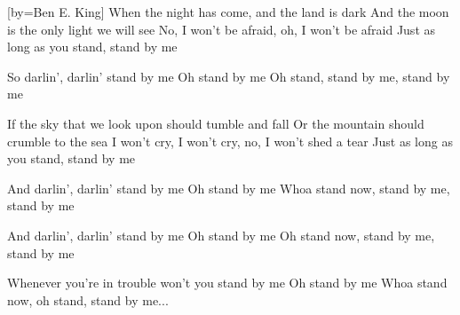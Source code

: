 [by={Ben E. King}]
\beginverse
When the night has come, and the land is dark
And the moon is the only light we will see
No, I won't be afraid, oh, I won't be afraid
Just as long as you stand, stand by me
\endverse

\beginchorus
So darlin', darlin' stand by me
Oh stand by me
Oh stand, stand by me, stand by me
\endchorus

\beginverse 
If the sky that we look upon should tumble and fall
Or the mountain should crumble to the sea
I won't cry, I won't cry, no, I won't shed a tear
Just as long as you stand, stand by me
\endverse

\beginchorus
And darlin', darlin' stand by me
Oh stand by me
Whoa stand now, stand by me, stand by me
\endchorus

\beginchorus
And darlin', darlin' stand by me
Oh stand by me
Oh stand now, stand by me, stand by me
\endchorus

\beginchorus
Whenever you're in trouble won't you stand by me
Oh stand by me
Whoa stand now, oh stand, stand by me... 
\endchorus
\endsong

